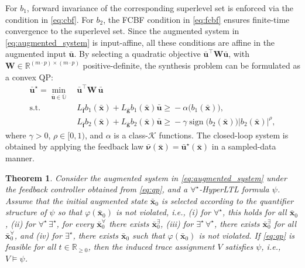 \documentclass[letterpaper, 10 pt, conference]{ieeeconf}  %
\newtheorem{theorem}{Theorem}
\begin{document}
For $b_1$, forward invariance of the corresponding superlevel set is enforced via the condition in \eqref{eq:cbf}. For $b_2$, the FCBF condition in \eqref{eq:fcbf} ensures finite-time convergence to the superlevel set. Since the augmented system in \eqref{eq:augmented_system} is input-affine, all these conditions are affine in the augmented input $\bar{\mathbf{u}}$. By selecting a quadratic objective $\bar{\mathbf{u}}^\top \mathbf{W} \bar{\mathbf{u}}$, with $\mathbf{W} \in \mathbb{R}^{(m \cdot p) \times (m \cdot p)}$ positive-definite, the synthesis problem can be formulated as a convex QP:
\begin{equation} \label{eq:qp}
    \begin{aligned}
        \bar{\mathbf{u}}^\star = \min_{\bar{\mathbf{u}} \in \bar{\mathbb{U}}} \ & \bar{\mathbf{u}}^\top \mathbf{W} \, \bar{\mathbf{u}} \\
        \text{s.t.} \quad 
        &L_{\bar{\mathbf{f}}} b_1(\bar{\mathbf{x}}) + L_{\bar{\mathbf{g}}} b_1(\bar{\mathbf{x}}) \bar{\mathbf{u}} \ge \! -\alpha \big(b_1(\bar{\mathbf{x}})\big),\\
        &L_{\bar{\mathbf{f}}} b_2(\bar{\mathbf{x}}) + L_{\bar{\mathbf{g}}} b_2(\bar{\mathbf{x}}) \bar{\mathbf{u}} \ge \! -\gamma \operatorname{sign} \big( b_2(\bar{\mathbf{x}}) \big) \big| b_2(\bar{\mathbf{x}}) \big|^\rho,
    \end{aligned}
\end{equation}
where $\gamma > 0$, $\rho \in [0, 1)$, and $\alpha$ is a class-$\mathcal{K}$ functions. The closed-loop system is obtained by applying the feedback law $\bar{\boldsymbol{\nu}}(\bar{\mathbf{x}}) = \bar{\mathbf{u}}^\star(\bar{\mathbf{x}})$ in a sampled-data manner.

\begin{theorem} \label{thm:qp}
    Consider the augmented system in \eqref{eq:augmented_system} under the feedback controller obtained from \eqref{eq:qp}, and a $\forall^\star$-HyperLTL formula $\psi$.  Assume that the initial augmented state $\bar{\mathbf{x}}_0$ is selected according to the quantifier structure of $\psi$ so that $\varphi(\bar{\mathbf{x}}_0)$ is not violated, i.e., (i) for $\forall^\star$, this holds for all $\bar{\mathbf{x}}_0$, (ii) for $\forall^\star \, \exists^\star$, for every $\bar{\mathbf{x}}_0^{\forall}$ there exists $\bar{\mathbf{x}}_0^{\exists}$, (iii) for $\exists^\star \, \forall^\star$, there exists $\bar{\mathbf{x}}_0^{\exists}$ for all $\bar{\mathbf{x}}_0^{\forall}$, and (iv) for $\exists^\star$, there exists $\bar{\mathbf{x}}_0$ such that $\varphi(\bar{\mathbf{x}}_0)$ is not violated.  If \eqref{eq:qp} is feasible for all $t \in \mathbb{R}_{\ge 0}$, then the induced trace assignment $V$ satisfies $\psi$, i.e., $V \models \psi$.
\end{theorem}
\end{document}
